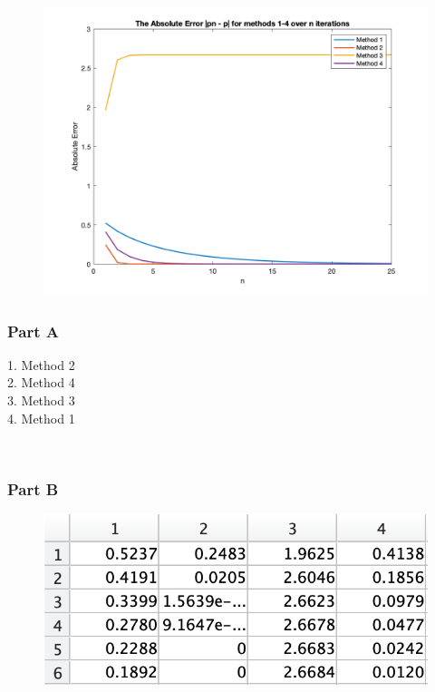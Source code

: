 \documentclass[11pt, oneside]{article}   	%
\date{}							%
\begin{document}
\begin{figure}
\centering
\includegraphics [scale=.18] {Plot_Abs_Error.png}
\end{figure}

\subsubsection*{Part A}

1. Method 2\\
2. Method 4\\
3. Method 3\\
4. Method 1

$~~~~~$
\\

\subsubsection*{Part B}

\begin{figure}
\centering
\includegraphics [scale=.54] {Table_AbsErrors.png}
\end{figure}
\end{document}
